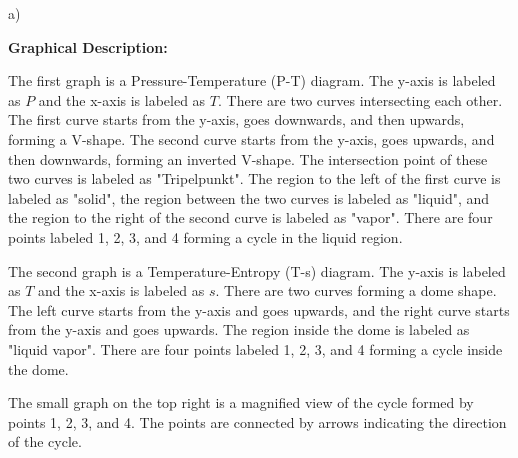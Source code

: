 a)

\textbf{Graphical Description:}

The first graph is a Pressure-Temperature (P-T) diagram. The y-axis is labeled as \( P \) and the x-axis is labeled as \( T \). There are two curves intersecting each other. The first curve starts from the y-axis, goes downwards, and then upwards, forming a V-shape. The second curve starts from the y-axis, goes upwards, and then downwards, forming an inverted V-shape. The intersection point of these two curves is labeled as "Tripelpunkt". The region to the left of the first curve is labeled as "solid", the region between the two curves is labeled as "liquid", and the region to the right of the second curve is labeled as "vapor". There are four points labeled 1, 2, 3, and 4 forming a cycle in the liquid region.

The second graph is a Temperature-Entropy (T-s) diagram. The y-axis is labeled as \( T \) and the x-axis is labeled as \( s \). There are two curves forming a dome shape. The left curve starts from the y-axis and goes upwards, and the right curve starts from the y-axis and goes upwards. The region inside the dome is labeled as "liquid vapor". There are four points labeled 1, 2, 3, and 4 forming a cycle inside the dome.

The small graph on the top right is a magnified view of the cycle formed by points 1, 2, 3, and 4. The points are connected by arrows indicating the direction of the cycle.